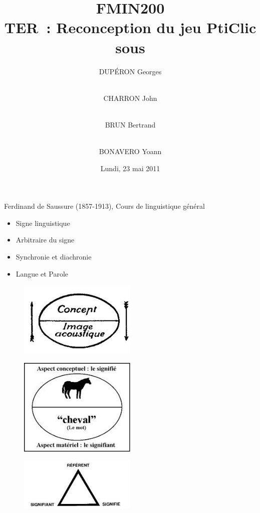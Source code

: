 \documentclass{beamer}
\title{FMIN200 \\ TER~: Reconception du jeu PtiClic sous \android{}}
\author{DUPÉRON Georges \and\\ CHARRON John \and\\ BRUN Bertrand \and\\ BONAVERO Yoann}
\institute{Université Montpellier II, Département informatique}
\date{Lundi, 23 mai 2011}
\begin{document}
\begin{frame}
  \titlepage
\end{frame}

\begin{frame}
  Ferdinand de Saussure (1857-1913), Cours de linguistique général
  \begin{itemize}
  \item Signe linguistique
  \item Arbitraire du signe
  \item Synchronie et diachronie
  \item Langue et Parole
  \end{itemize}
\end{frame}


\begin{frame}  
\begin{figure}[h!]
  \centering
      \includegraphics[width=0.5\textwidth]{img/signe-conceptimageacoustique.jpeg}
\end{figure}
\end{frame}

\begin{frame}
\begin{figure}[h!]
  \centering
      \includegraphics[width=0.5\textwidth]{img/signe-cheval.jpeg}
\end{figure}
\end{frame}

\begin{frame}
\begin{figure}[h!]
  \centering
      \includegraphics[width=0.5\textwidth]{img/trianglesemiotique.jpeg}
\end{figure}
\end{frame}
\end{document}
